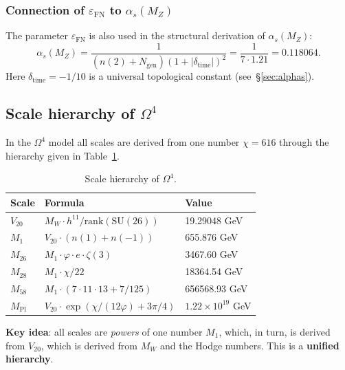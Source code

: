\documentclass[11pt,a4paper]{article}
\newcommand{\SU}{\ensuremath{\mathrm{SU}}}
\newcommand{\Om}{\ensuremath{\Omega^4}}
\newcommand{\Ngen}{\ensuremath{N_{\text{gen}}}}
\newcommand{\epsFN}{\ensuremath{\varepsilon_{\text{FN}}}}
\theoremstyle{definition}
\begin{document}
\subsubsection{Connection of \texorpdfstring{$\epsFN$}{epsilon\_FN} to \texorpdfstring{$\alpha_s(M_Z)$}{alpha\_s(M\_Z)}}

The parameter $\epsFN$ is also used in the structural derivation of
$\alpha_s(M_Z)$:
\begin{equation}
    \alpha_s(M_Z) = \frac{1}{(n(2) + \Ngen)(1 + |\delta_{\text{time}}|)^2}
    = \frac{1}{7 \cdot 1.21} = 0.118064.
    \label{eq:alphas-from-eps-fn}
\end{equation}
Here $\delta_{\text{time}} = -1/10$ is a universal
topological constant (see~\S\ref{sec:alphas}).
\subsection{Scale hierarchy of \texorpdfstring{$\Om$}{Omega4}}
\label{subsec:scale-hierarchy}

In the $\Om$ model all scales are derived from one number $\chi = 616$
through the hierarchy given in Table~\ref{tab:scale-hierarchy}.

\begin{table}[ht]
\centering
\caption{Scale hierarchy of \texorpdfstring{$\Om$}{}.}
\label{tab:scale-hierarchy}
\begin{tabular}{lll}
\toprule
Scale & Formula & Value \\
\midrule
$V_{20}$ & $M_W \cdot h^{11}/\text{rank}(\SU(26))$ & 19.29048 GeV \\
$M_1$ & $V_{20} \cdot (n(1) + n(-1))$ & 655.876 GeV \\
$M_{26}$ & $M_1 \cdot \varphi \cdot e \cdot \zeta(3)$ & 3467.60 GeV \\
$M_{28}$ & $M_1 \cdot \chi/22$ & 18364.54 GeV \\
$M_{58}$ & $M_1 \cdot (7 \cdot 11 \cdot 13 + 7/125)$ & 656568.93 GeV \\
$M_{\text{Pl}}$ & $V_{20} \cdot \exp(\chi/(12\varphi) + 3\pi/4)$ & $1.22 \times 10^{19}$ GeV \\
\bottomrule
\end{tabular}
\end{table}

\medskip\noindent
\textbf{Key idea}: all scales are \emph{powers} of one
number $M_1$, which, in turn, is derived from $V_{20}$,
which is derived from $M_W$ and the Hodge numbers. This is a \textbf{unified hierarchy}.
\end{document}
